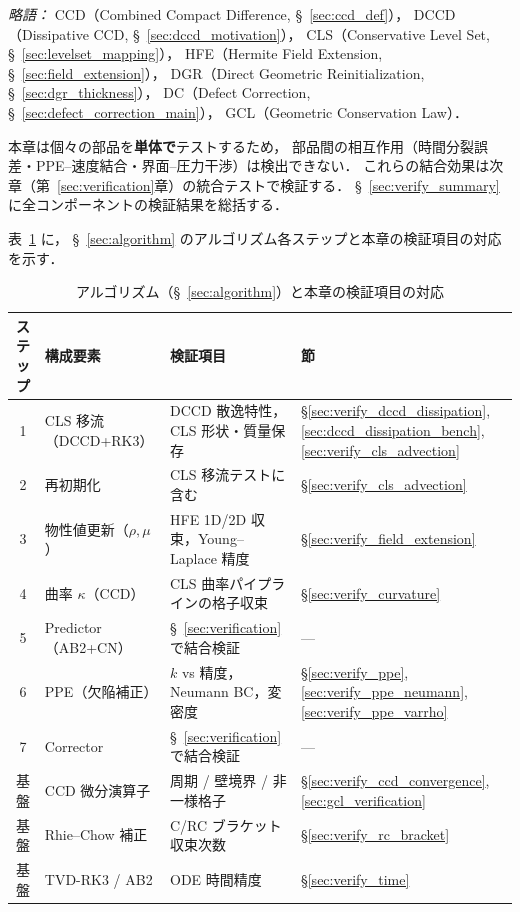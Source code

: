 \noindent\textit{略語：}
CCD（Combined Compact Difference, §~\ref{sec:ccd_def}），
DCCD（Dissipative CCD, §~\ref{sec:dccd_motivation}），
CLS（Conservative Level Set, §~\ref{sec:levelset_mapping}），
HFE（Hermite Field Extension, §~\ref{sec:field_extension}），
DGR（Direct Geometric Reinitialization, §~\ref{sec:dgr_thickness}），
DC（Defect Correction, §~\ref{sec:defect_correction_main}），
GCL（Geometric Conservation Law）．

\noindent
本章は個々の部品を\textbf{単体で}テストするため，
部品間の相互作用（時間分裂誤差・PPE--速度結合・界面--圧力干渉）は検出できない．
これらの結合効果は次章（第~\ref{sec:verification}章）の統合テストで検証する．
§~\ref{sec:verify_summary} に全コンポーネントの検証結果を総括する．

表~\ref{tab:component_algorithm_map} に，
§~\ref{sec:algorithm} のアルゴリズム各ステップと本章の検証項目の対応を示す．

\begin{table}[htbp]
\centering
\caption{アルゴリズム（§~\ref{sec:algorithm}）と本章の検証項目の対応}
\label{tab:component_algorithm_map}
\renewcommand{\arraystretch}{1.3}
\small
\begin{tabular}{cl>{\raggedright\arraybackslash}p{4.2cm}>{\raggedright\arraybackslash}p{4.0cm}}
\toprule
ステップ & 構成要素 & 検証項目 & 節 \\
\midrule
1 & CLS 移流（DCCD+RK3） & DCCD 散逸特性，CLS 形状・質量保存 & §\ref{sec:verify_dccd_dissipation}, \ref{sec:dccd_dissipation_bench}, \ref{sec:verify_cls_advection} \\
2 & 再初期化 & CLS 移流テストに含む & §\ref{sec:verify_cls_advection} \\
3 & 物性値更新（$\rho, \mu$） & HFE 1D/2D 収束，Young--Laplace 精度 & §\ref{sec:verify_field_extension} \\
4 & 曲率 $\kappa$（CCD） & CLS 曲率パイプラインの格子収束 & §\ref{sec:verify_curvature} \\
5 & Predictor（AB2+CN） & §~\ref{sec:verification} で結合検証 & — \\
6 & PPE（欠陥補正） & $k$ vs 精度，Neumann BC，変密度 & §\ref{sec:verify_ppe}, \ref{sec:verify_ppe_neumann}, \ref{sec:verify_ppe_varrho} \\
7 & Corrector & §~\ref{sec:verification} で結合検証 & — \\
\midrule
基盤 & CCD 微分演算子 & 周期 / 壁境界 / 非一様格子 & §\ref{sec:verify_ccd_convergence}, \ref{sec:gcl_verification} \\
基盤 & Rhie--Chow 補正 & C/RC ブラケット収束次数 & §\ref{sec:verify_rc_bracket} \\
基盤 & TVD-RK3 / AB2 & ODE 時間精度 & §\ref{sec:verify_time} \\
\bottomrule
\end{tabular}
\end{table}

